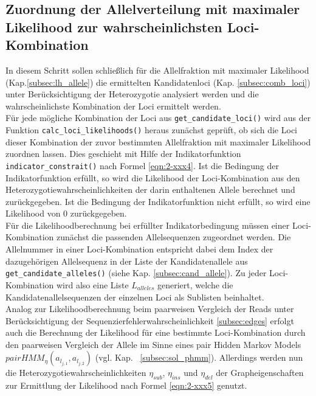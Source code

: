 \subsection{Zuordnung der Allelverteilung mit maximaler Likelihood zur wahrscheinlichsten Loci-Kombination} \label{subsec:lh_loci}

In diesem Schritt sollen schließlich für die Allelfraktion mit maximaler Likelihood (Kap.\ref{subsec:lh_allele}) die ermittelten Kandidatenloci (Kap. \ref{subsec:comb_loci}) unter Berücksichtigung der Heterozygotie analysiert werden und die wahrscheinlichste Kombination der Loci ermittelt werden.\\

Für jede mögliche Kombination der Loci aus \lstinline|get_candidate_loci()| wird aus der Funktion \lstinline|calc_loci_likelihoods()| heraus zunächst geprüft, ob sich die Loci dieser Kombination der zuvor bestimmten Allelfraktion mit maximaler Likelihood zuordnen lassen. Dies geschieht mit Hilfe der Indikatorfunktion \lstinline|indicator_constrait()| nach Formel \eqref{eqn:2-xxx4}. Ist die Bedingung der Indikatorfunktion erfüllt, so wird die Likelihood der Loci-Kombination aus den Heterozygotiewahrscheinlichkeiten der darin enthaltenen Allele berechnet und zurückgegeben. Ist die Bedingung der Indikatorfunktion nicht erfüllt, so wird eine Likelihood von 0 zurückgegeben.\\

Für die Likelihoodberechnung bei erfüllter Indikatorbedingung müssen einer Loci-Kombination zunächst die passenden Allelsequenzen zugeordnet werden. Die Allelnummer in einer Loci-Kombination entspricht dabei dem Index der dazugehörigen Allelsequenz in der Liste der Kandidatenallele aus \lstinline|get_candidate_alleles()| (siehe Kap. \ref{subsec:cand_allele}). Zu jeder Loci-Kombination wird also eine Liste $ L_{alleles} $ generiert, welche die Kandidatenallelsequenzen der einzelnen Loci als Sublisten beinhaltet.\\

Analog zur Likelihoodberechnung beim paarweisen Vergleich der Reads unter Berücksichtigung der Sequenzierfehlerwahrscheinlichkeit \ref{subsec:edges} erfolgt auch die Berechnung der Likelihood für eine bestimmte Loci-Kombination durch den paarweisen Vergleich der Allele im Sinne eines pair Hidden Markov Models $ pairHMM_{\eta}(a_{l_{j,1}}, a_{l_{j,2}}) $ (vgl. Kap. ~\ref{subsec:sol_phmm}). Allerdings werden nun die Heterozygotiewahrscheinlichkeiten $\eta_{sub}$, $\eta_{ins}$ und $\eta_{del}$ der Grapheigenschaften zur Ermittlung der Likelihood nach Formel \eqref{eqn:2-xxx5} genutzt.  \\

